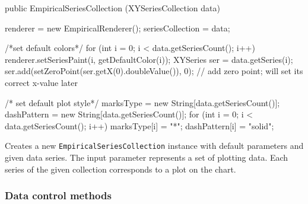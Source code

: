 \begin{htmlonly}
\end{htmlonly}
\begin{code}

   public EmpiricalSeriesCollection (XYSeriesCollection data) \begin{hide} {
      renderer = new EmpiricalRenderer();
      seriesCollection = data;

      /*set default colors*/
      for (int i = 0; i < data.getSeriesCount(); i++) {
         renderer.setSeriesPaint(i, getDefaultColor(i));
         XYSeries ser = data.getSeries(i);
         ser.add(setZeroPoint(ser.getX(0).doubleValue()), 0); // add zero point; will set its correct x-value later
     }

      /* set default plot style*/
      marksType = new String[data.getSeriesCount()];
      dashPattern = new String[data.getSeriesCount()];
      for (int i = 0; i < data.getSeriesCount(); i++) {
         marksType[i] = "*";
         dashPattern[i] = "solid";
      }
   }\end{hide}
\end{code}
\begin{tabb}
   Creates a new \texttt{EmpiricalSeriesCollection} instance with default parameters and given data series.
   The input parameter represents a set of plotting data.
   Each series of the given collection corresponds to a plot on the chart.
\end{tabb}
\begin{htmlonly}
\end{htmlonly}

\subsubsection*{Data control methods}

